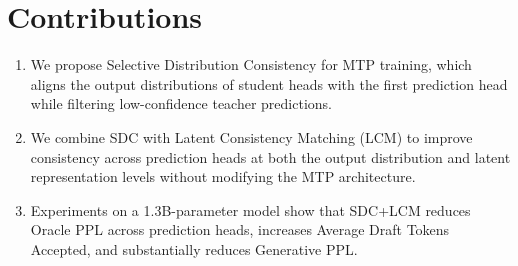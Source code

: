 \section{Contributions}\label{sec:1-contribution}

\begin{enumerate}
    \item We propose Selective Distribution Consistency for MTP training, which aligns the output distributions of student heads with the first prediction head while filtering low-confidence teacher predictions.

    \item We combine SDC with Latent Consistency Matching (LCM) to improve consistency across prediction heads at both the output distribution and latent representation levels without modifying the MTP architecture.

    \item Experiments on a 1.3B-parameter model show that SDC+LCM reduces Oracle PPL across prediction heads, increases Average Draft Tokens Accepted, and substantially reduces Generative PPL.

\end{enumerate}



